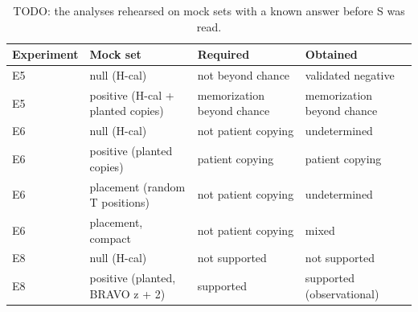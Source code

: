 \begin{table}
\centering
\small
\begin{tabular}{llll}
\toprule
Experiment & Mock set & Required & Obtained \\
\midrule
E5 & null (H-cal) & not beyond chance & validated negative \\
E5 & positive (H-cal + planted copies) & memorization beyond chance & memorization beyond chance \\
E6 & null (H-cal) & not patient copying & undetermined \\
E6 & positive (planted copies) & patient copying & patient copying \\
E6 & placement (random T positions) & not patient copying & undetermined \\
E6 & placement, compact & not patient copying & mixed \\
E8 & null (H-cal) & not supported & not supported \\
E8 & positive (planted, BRAVO z + 2) & supported & supported (observational) \\
\bottomrule
\end{tabular}
\caption{TODO: the analyses rehearsed on mock sets with a known answer before S was read.}
\label{tab:rehearsals}
\end{table}
